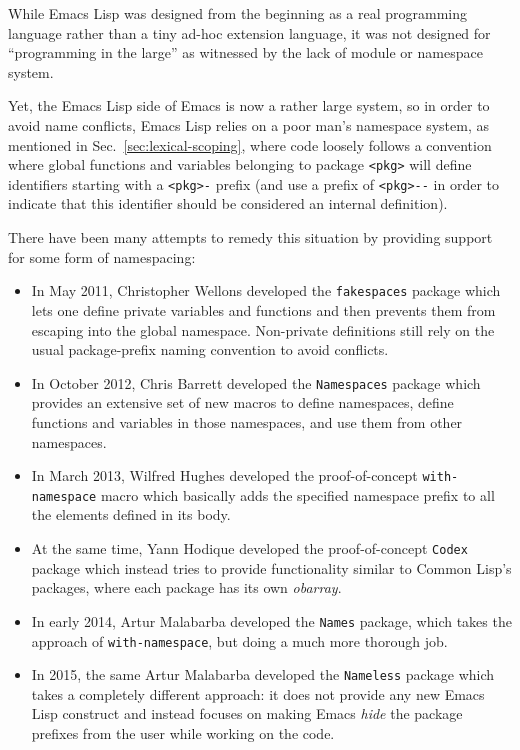 \documentclass[format=acmsmall, review]{acmart}
\newcommand \Elisp {Emacs Lisp}
\begin{document}
While \Elisp{} was designed from the beginning as a real programming
language rather than a tiny ad-hoc extension language, it was not designed
for ``programming in the large'' as witnessed by the lack of module or
namespace system.

Yet, the \Elisp{} side of Emacs is now a rather large system, so in order to
avoid name conflicts, \Elisp{} relies on a poor man's namespace system, as
mentioned in Sec.~\ref{sec:lexical-scoping}, where code loosely follows
a convention where global functions and variables belonging to package
\verb|<pkg>| will define identifiers starting with a \verb|<pkg>-|
prefix (and use a prefix of \verb|<pkg>--| in order to indicate that this
identifier should be considered an internal definition).

There have been many attempts to remedy this situation by providing support
for some form of namespacing:
\begin{itemize}
\item In May 2011, Christopher Wellons developed the \texttt{fakespaces} package which
  lets one define private variables and functions and then prevents them
  from escaping into the global namespace.  Non-private definitions still
  rely on the usual package-prefix naming convention to avoid conflicts.
\item In October 2012, Chris Barrett developed the \texttt{Namespaces} package which
  provides an extensive set of new macros to define namespaces, define
  functions and variables in those namespaces, and use them from
  other namespaces.
\item In March 2013, Wilfred Hughes developed the proof-of-concept
  \texttt{with-namespace} macro which basically adds the specified namespace
  prefix to all the elements defined in its body.
\item At the same time, Yann Hodique developed the proof-of-concept \texttt{Codex}
  package which instead tries to provide functionality similar to
  Common Lisp's packages, where each package has its own \emph{obarray}.
\item In early 2014, Artur Malabarba developed the \texttt{Names} package, which
  takes the approach of \texttt{with-namespace}, but doing a much more
  thorough job.
\item In 2015, the same Artur Malabarba developed the \texttt{Nameless} package which
  takes a completely different approach: it does not provide any new
  \Elisp{} construct and instead focuses on making Emacs \emph{hide} the
  package prefixes from the user while working on the code.
\end{itemize}
\end{document}
